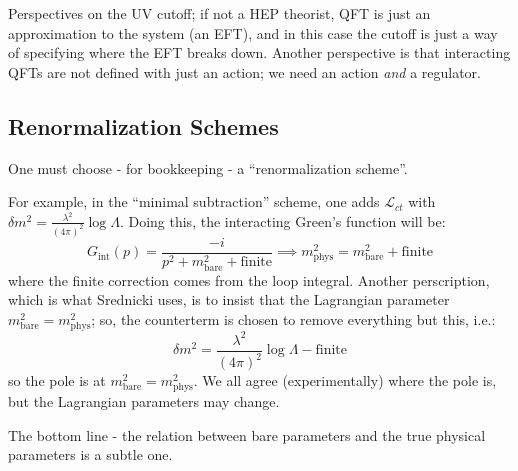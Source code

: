 Perspectives on the UV cutoff; if not a HEP theorist, QFT is just an approximation to the system (an EFT), and in this case the cutoff is just a way of specifying where the EFT breaks down. Another perspective is that interacting QFTs are not defined with just an action; we need an action \emph{and} a regulator. 

\subsection{Renormalization Schemes}
One must choose - for bookkeeping - a ``renormalization scheme''.

For example, in the ``minimal subtraction'' scheme, one adds $\mathcal{L}_{ct}$ with $\delta m^2 = \frac{\lambda^2}{(4\pi)^2}\log \Lambda$. Doing this, the interacting Green's function will be:
\begin{equation}
    G_{\text{int}}(p) = \frac{-i}{p^2 + m_{\text{bare}}^2 + \text{finite}} \implies m_{\text{phys}}^2 = m_{\text{bare}}^2 + \text{finite}
\end{equation}
where the finite correction comes from the loop integral. Another perscription, which is what Srednicki uses, is to insist that the Lagrangian parameter $m_{\text{bare}}^2 = m_{\text{phys}}^2$; so, the counterterm is chosen to remove everything but this, i.e.:
\begin{equation}
    \delta m^2 = \frac{\lambda^2}{(4\pi)^2}\log \Lambda - \text{finite}
\end{equation}
so the pole is at $m_{\text{bare}}^2 = m_{\text{phys}}^2$. We all agree (experimentally) where the pole is, but the Lagrangian parameters may change. 

The bottom line - the relation between bare parameters and the true physical parameters is a subtle one.

